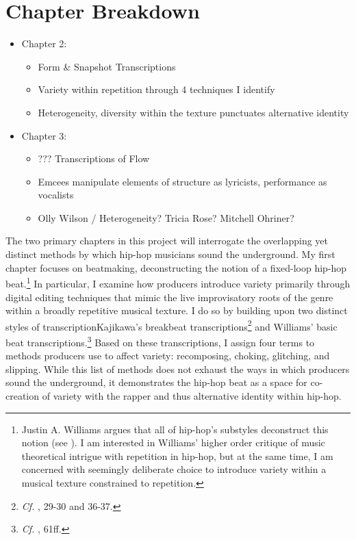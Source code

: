 \section{Chapter Breakdown}
\begin{itemize}
    \item Chapter 2: 
        \begin{itemize}
            \item Form \& Snapshot Transcriptions
            \item Variety within repetition through 4 techniques I identify
            \item Heterogeneity, diversity within the texture punctuates alternative identity
        \end{itemize}
    \item Chapter 3:
        \begin{itemize}
            \item ??? Transcriptions of Flow
            \item Emcees manipulate elements of structure as lyricists, performance as vocalists
            \item Olly Wilson / Heterogeneity? Tricia Rose? Mitchell Ohriner?
        \end{itemize}
\end{itemize}

The two primary chapters in this project will interrogate the overlapping yet distinct methods by which hip-hop musicians sound the underground. My first chapter focuses on beatmaking, deconstructing the notion of a fixed-loop hip-hop beat.\footnote{Justin A. Williams argues that all of hip-hop's substyles deconstruct this notion (see \cite{justinawilliamsBeatsFlowsResponse2009}). I am interested in Williams' higher order critique of music theoretical intrigue with repetition in hip-hop, but at the same time, I am concerned with seemingly deliberate choice to introduce variety within a musical texture constrained to repetition.} In particular, I examine how producers introduce variety primarily through digital editing techniques that mimic the live improvisatory roots of the genre within a broadly repetitive musical texture. I do so by building upon two distinct styles of transcription\textemdash Kajikawa's breakbeat  transcriptions\footnote{\textit{Cf.} \cite{lorenkajikawaSoundingRaceRap2015}, 29-30 and 36-37.} and Williams' basic beat transcriptions.\footnote{\textit{Cf.} \cite{justinawilliamsRhyminStealinMusical2013}, 61ff.} Based on these transcriptions, I assign four terms to methods producers use to affect variety: recomposing, choking, glitching, and slipping. While this list of methods does not exhaust the ways in which producers sound the underground, it demonstrates the hip-hop beat as a space for co-creation of variety with the rapper and thus alternative identity within hip-hop.


